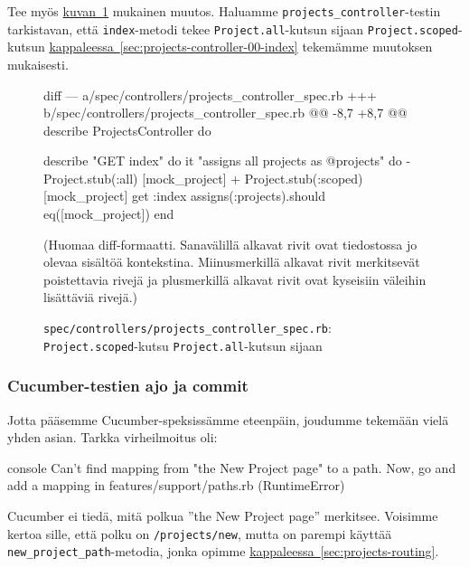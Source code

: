 \documentclass{article}
\newenvironment{myfigure}[1][tbp]{
  \begin{figure}[#1]
    \centering
    \begin{lrbox}{\myfigurebox}
      \begin{minipage}{\textwidth}
}{
      \end{minipage}
    \end{lrbox}
    \colorbox{blue!4}{\usebox{\myfigurebox}}
  \end{figure}
}
\newcommand{\myref}[2]{\hyperref[#2]{#1~\ref*{#2}}}
\newcommand{\pdfforeignlanguage}[2]{\texorpdfstring{\foreignlanguage{#1}{#2}}{#2}}
\newcommand{\eng}[1]{\pdfforeignlanguage{english}{#1}}
\begin{document}
\begin{samepage}
Tee myös \myref{kuvan}{fig:projects-controller-spec-scoped-call} mukainen
muutos. Haluamme \texttt{projects\_controller}-testin tarkistavan, että
\texttt{index}-metodi tekee \texttt{Project.all}-kutsun sijaan
\texttt{Project.scoped}-kutsun
\myref{kappaleessa}{sec:projects-controller-00-index} tekemämme muutoksen
mukaisesti.

\begin{myfigure}[H]
\caption{\texttt{spec/controllers/projects\_controller\_spec.rb}:
\texttt{Project.scoped}-kutsu \texttt{Project.all}-kutsun sijaan}
\label{fig:projects-controller-spec-scoped-call}

\begin{pygmented}{diff}
--- a/spec/controllers/projects_controller_spec.rb
+++ b/spec/controllers/projects_controller_spec.rb
@@ -8,7 +8,7 @@ describe ProjectsController do
 
   describe "GET index" do
     it "assigns all projects as @projects" do
-      Project.stub(:all) { [mock_project] }
+      Project.stub(:scoped) { [mock_project] }
       get :index
       assigns(:projects).should eq([mock_project])
     end
\end{pygmented}

(Huomaa diff-formaatti. Sanavälillä alkavat rivit ovat tiedostossa jo olevaa
sisältöä kontekstina. Miinusmerkillä alkavat rivit merkitsevät poistettavia
rivejä ja plusmerkillä alkavat rivit ovat kyseisiin väleihin lisättäviä
rivejä.)
\end{myfigure}
\end{samepage}

\subsubsection{Cucumber-testien ajo ja commit}

\begin{samepage}
Jotta pääsemme Cucumber-speksissämme eteenpäin, joudumme tekemään vielä yhden
asian. Tarkka virheilmoitus oli:

\begin{pygmented}{console}
      Can't find mapping from "the New Project page" to a path.
      Now, go and add a mapping in features/support/paths.rb (RuntimeError)
\end{pygmented}
\end{samepage}

Cucumber ei tiedä, mitä polkua ''\eng{the New Project page}'' merkitsee.
Voisimme kertoa sille, että polku on \texttt{/projects/new}, mutta on parempi
käyttää \texttt{new\_project\_path}-metodia, jonka opimme
\myref{kappaleessa}{sec:projects-routing}.
\end{document}
